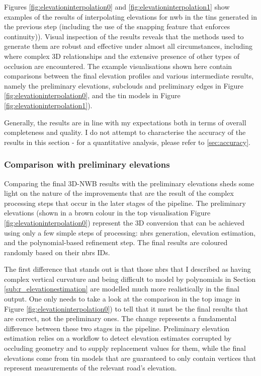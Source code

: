 Figures \ref{fig:elevationinterpolation0} and \ref{fig:elevationinterpolation1} show examples of the results of interpolating elevations for \ac{nwb} in the \ac{tin}s generated in the previous step (including the use of the snapping feature that enforces continuity)). Visual inspection of the results reveals that the methods used to generate them are robust and effective under almost all circumstances, including where complex 3D relationships and the extensive presence of other types of occlusion are encountered. The example visualisations shown here contain comparisons between the final elevation profiles and various intermediate results, namely the preliminary elevations, subclouds and preliminary edges in Figure \ref{fig:elevationinterpolation0}, and the \ac{tin} models in Figure \ref{fig:elevationinterpolation1}).

Generally, the results are in line with my expectations both in terms of overall completeness and quality. I do not attempt to characterise the accuracy of the results in this section - for a quantitative analysis, please refer to \ref{sec:accuracy}.

\subsubsection{Comparison with preliminary elevations}

Comparing the final 3D-NWB results with the preliminary elevations sheds some light on the nature of the improvements that are the result of the complex processing steps that occur in the later stages of the pipeline. The preliminary elevations (shown in a brown colour in the top visualisation Figure \ref{fig:elevationinterpolation0}) represent the 3D conversion that can be achieved using only a few simple steps of processing: \ac{nbrs} generation, elevation estimation, and the polynomial-based refinement step. The final results are coloured randomly based on their \ac{nbrs} IDs.

The first difference that stands out is that those \ac{nbrs} that I described as having complex vertical curvature and being difficult to model by polynomials in Section \ref{sub:r_elevationestimation} are modelled much more realistically in the final output. One only needs to take a look at the comparison in the top image in Figure \ref{fig:elevationinterpolation0}) to tell that it must be the final results that are correct, not the preliminary ones. The change represents a fundamental difference between these two stages in the pipeline. Preliminary elevation estimation relies on a workflow to detect elevation estimates corrupted by occluding geometry and to supply replacement values for them, while the final elevations come from \ac{tin} models that are guaranteed to only contain vertices that represent measurements of the relevant road's elevation.

